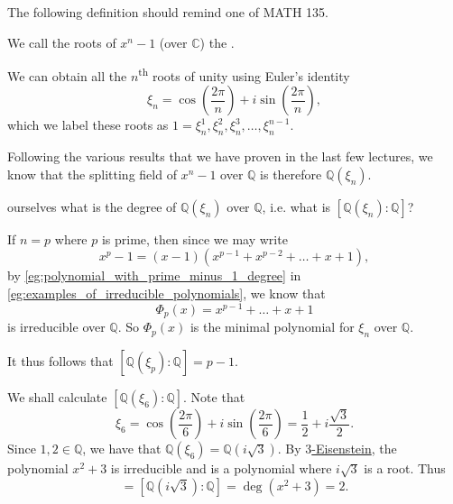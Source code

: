 \documentclass[notoc,notitlepage,nobib]{tufte-book}
\begin{document}
The following definition should remind one of MATH 135.

\begin{defn}\label{defn:_n_th_roots_of_unity}
  We call the roots of $x^n - 1$ (over $\mathbb{C}$) the .
\end{defn}

\begin{eg}
  We can obtain all the $n$\textsuperscript{th} roots of unity using Euler's identity
  \begin{equation*}
    \xi_n = \cos \left( \frac{2\pi}{n} \right) + i \sin \left( \frac{2 \pi}{n} \right),
  \end{equation*}
  which we label these roots as $1 = \xi_n^1, \xi_n^2, \xi_n^3, \ldots, \xi_n^{n - 1}$.
\end{eg}

Following the various results that we have proven in the last few lectures, we know that
the splitting field of $x^n - 1$ over $\mathbb{Q}$ is therefore $\mathbb{Q}(\xi_n)$.

 ourselves what is the degree of $\mathbb{Q}(\xi_n)$ over
$\mathbb{Q}$, i.e. what is $[ \mathbb{Q}(\xi_n) : \mathbb{Q} ]$?

If $n = p$ where $p$ is prime, then since we may write
\begin{equation*}
  x^p - 1 = (x - 1)(x^{p - 1} + x^{p - 2} + \hdots + x + 1),
\end{equation*}
by \cref{eg:polynomial_with_prime_minus_1_degree} in
\cref{eg:examples_of_irreducible_polynomials}, we know that
\begin{equation*}
  \Phi_p(x) = x^{p - 1} + \hdots + x + 1
\end{equation*}
is irreducible over $\mathbb{Q}$. So $\Phi_p(x)$ is the minimal polynomial for $\xi_n$
over $\mathbb{Q}$.

It thus follows that $[ \mathbb{Q}(\xi_p) : \mathbb{Q} ] = p - 1$.

\begin{eg}
  We shall calculate $[ \mathbb{Q}(\xi_6) : \mathbb{Q} ]$. Note that
  \begin{equation*}
    \xi_6 = \cos \left( \frac{2 \pi}{6} \right) + i \sin \left( \frac{2 \pi}{6} \right) =
    \frac{1}{2} + i \frac{\sqrt{3}}{2}.
  \end{equation*}
  Since $1, 2 \in \mathbb{Q}$, we have that $\mathbb{Q}(\xi_6) = \mathbb{Q}(i \sqrt{3})$.
  By \hyperref[propo:eisenstein_s_criterion]{$3$-Eisenstein}, the polynomial $x^2 + 3$ is
  irreducible and is a polynomial where $i \sqrt{3}$ is a root. Thus
  \begin{equation*}
    [ \mathbb{Q}(\xi_6) : \mathbb{Q} ] = [ \mathbb{Q}(i \sqrt{3}) : \mathbb{Q} ] = \deg
      (x^2 + 3) = 2.
  \end{equation*}
\end{eg}
\end{document}
